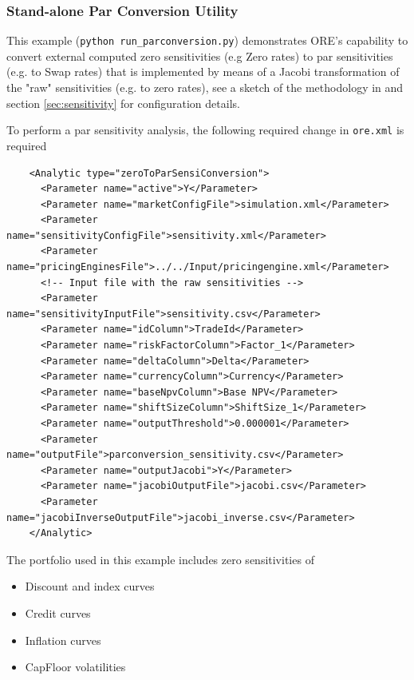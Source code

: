 \subsubsection{Stand-alone Par Conversion Utility}
\label{example:marketrisk_parconversionl}

This example ({\tt python run\_parconversion.py}) demonstrates ORE's capability to convert external computed zero sensitivities (e.g Zero rates) to par sensitivities (e.g. to Swap rates) 
that is implemented  by means of a Jacobi transformation of the "raw" sensitivities (e.g. to zero rates), see a sketch of the 
methodology in \cite{methods} and section \ref{sec:sensitivity} for configuration details.

To perform a par sensitivity analysis, the following required change in {\tt ore.xml} is required

\begin{verbatim}
    <Analytic type="zeroToParSensiConversion">
      <Parameter name="active">Y</Parameter>
      <Parameter name="marketConfigFile">simulation.xml</Parameter>
      <Parameter name="sensitivityConfigFile">sensitivity.xml</Parameter>
      <Parameter name="pricingEnginesFile">../../Input/pricingengine.xml</Parameter>
	  <!-- Input file with the raw sensitivities -->
      <Parameter name="sensitivityInputFile">sensitivity.csv</Parameter>
      <Parameter name="idColumn">TradeId</Parameter>
      <Parameter name="riskFactorColumn">Factor_1</Parameter>
      <Parameter name="deltaColumn">Delta</Parameter>
	  <Parameter name="currencyColumn">Currency</Parameter>
	  <Parameter name="baseNpvColumn">Base NPV</Parameter>
 	  <Parameter name="shiftSizeColumn">ShiftSize_1</Parameter>
      <Parameter name="outputThreshold">0.000001</Parameter>
      <Parameter name="outputFile">parconversion_sensitivity.csv</Parameter>
      <Parameter name="outputJacobi">Y</Parameter>
      <Parameter name="jacobiOutputFile">jacobi.csv</Parameter>
      <Parameter name="jacobiInverseOutputFile">jacobi_inverse.csv</Parameter>
    </Analytic>
\end{verbatim}

The portfolio used in this example includes zero sensitivities of 
\begin{itemize}
\item Discount and index curves
\item Credit curves
\item Inflation curves
\item CapFloor volatilities
\end{itemize}

